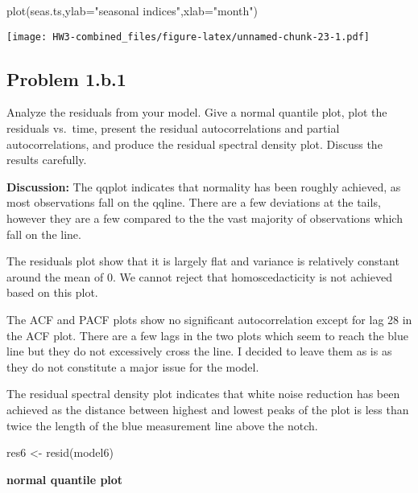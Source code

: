 \documentclass[
]{article}
\newenvironment{Shaded}{\begin{snugshade}}{\end{snugshade}}
\newcommand{\AttributeTok}[1]{\textcolor[rgb]{0.77,0.63,0.00}{#1}}
\newcommand{\FunctionTok}[1]{\textcolor[rgb]{0.00,0.00,0.00}{#1}}
\newcommand{\NormalTok}[1]{#1}
\newcommand{\OtherTok}[1]{\textcolor[rgb]{0.56,0.35,0.01}{#1}}
\newcommand{\StringTok}[1]{\textcolor[rgb]{0.31,0.60,0.02}{#1}}
\begin{document}
\begin{Shaded}
\begin{Highlighting}[]
\FunctionTok{plot}\NormalTok{(seas.ts,}\AttributeTok{ylab=}\StringTok{"seasonal indices"}\NormalTok{,}\AttributeTok{xlab=}\StringTok{"month"}\NormalTok{)}
\end{Highlighting}
\end{Shaded}

\texttt{[image: HW3-combined\_files/figure-latex/unnamed-chunk-23-1.pdf]}

\hypertarget{problem-1.b.1}{%
\subsection{Problem 1.b.1}\label{problem-1.b.1}}

Analyze the residuals from your model. Give a normal quantile plot, plot
the residuals vs.~time, present the residual autocorrelations and
partial autocorrelations, and produce the residual spectral density
plot. Discuss the results carefully.

\textbf{Discussion:} The qqplot indicates that normality has been
roughly achieved, as most observations fall on the qqline. There are a
few deviations at the tails, however they are a few compared to the the
vast majority of observations which fall on the line.

The residuals plot show that it is largely flat and variance is
relatively constant around the mean of 0. We cannot reject that
homoscedacticity is not achieved based on this plot.

The ACF and PACF plots show no significant autocorrelation except for
lag 28 in the ACF plot. There are a few lags in the two plots which seem
to reach the blue line but they do not excessively cross the line. I
decided to leave them as is as they do not constitute a major issue for
the model.

The residual spectral density plot indicates that white noise reduction
has been achieved as the distance between highest and lowest peaks of
the plot is less than twice the length of the blue measurement line
above the notch.

\begin{Shaded}
\begin{Highlighting}[]
\NormalTok{res6 }\OtherTok{\textless{}{-}} \FunctionTok{resid}\NormalTok{(model6)}
\end{Highlighting}
\end{Shaded}

\textbf{normal quantile plot}
\end{document}
